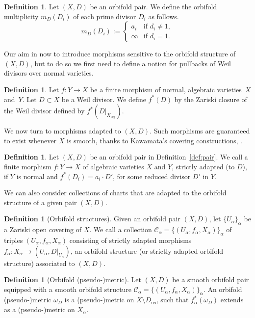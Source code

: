 \documentclass[10pt]{amsart}
\let\mathcal\mathscr
\theoremstyle{plain}
\theoremstyle{definition}
\newtheorem{definition}[theorem]{Definition}
\numberwithin{equation}{theorem}
\DeclareMathOperator{\reg}{reg}
\begin{document}
\begin{definition}
Let $(X,D)$ be an orbifold pair. We define the orbifold multiplicity $m_{D}(D_i)$ of each
prime divisor $D_i$ as follows.
$$
m_D(D_i) :=
\begin{cases}
a_i & \text{if $d_i\neq 1$}, \\
\infty & \text{if $d_i=1$}.
\end{cases}
$$
\end{definition}

Our aim in now to introduce morphisms sensitive to the orbifold structure of $(X,D)$, but to do so
we first need to define a notion for pullbacks of Weil divisors over normal varieties.

\begin{definition}\label{def:pullback}
Let $f: Y\to X$ be a finite morphism of normal, algebraic varieties~$X$ and~$Y$.
Let $D\subset X$ be a Weil divisor. We define
$f^*(D)$ by the Zariski closure of the Weil divisor defined by $f^*(D|_{X_{\reg}})$.
\end{definition}

We now turn to morphisms adapted to $(X,D)$. Such morphisms are guaranteed to
exist whenever $X$ is smooth, thanks to Kawamata's covering constructions,
\cf \cite[Prop.\,4.1.12]{Laz04-I}.

\begin{definition}\label{def:adapted}
Let $(X,D)$ be an orbifold pair in Definition~\ref{def:pair}. We call a finite morphism
$f: Y \to X$ of algebraic varieties $X$ and $Y$, strictly adapted (to $D$), if $Y$ is normal and
$f^*(D_i) = a_i \cdot D'$, for some reduced divisor $D'$ in $Y$.
\end{definition}

We can also consider collections of charts that are adapted to the orbifold
structure of a given pair $(X,D)$.

\begin{definition}[Orbifold structures]\label{def:structure}
Given an orbifold pair $(X,D)$, let $\{ U_{\alpha}\}_{\alpha}$ be a Zariski open covering of $X$.
We call a collection $\mathcal C_{\alpha} = \{ (U_{\alpha}, f_{\alpha}, X_{\alpha} )\}_{\alpha}$
of triples $(U_{\alpha}, f_{\alpha}, X_{\alpha})$
consisting of strictly adapted morphisms $f_{\alpha}: X_{\alpha} \to (U_{\alpha}, D|_{U_{\alpha}})$,
an orbifold structure (or strictly adapted orbifold structure) associated to $(X,D)$.
\end{definition}

\begin{definition}[Orbifold (pseudo-)metric]
Let $(X,D)$ be a smooth orbifold pair equipped with a smooth orbifold structure
$\mathcal C_{\alpha} = \{ (U_{\alpha}, f_{\alpha}, X_{\alpha}) \}_{\alpha}$. An orbifold (pseudo-)metric $\omega_D$ is a (pseudo-)metric on $X\setminus D_{\text{red}}$ such that $f_{\alpha}^*(\omega_D)$ extends as a (pseudo-)metric on $X_\alpha$.
\end{definition}
\end{document}
